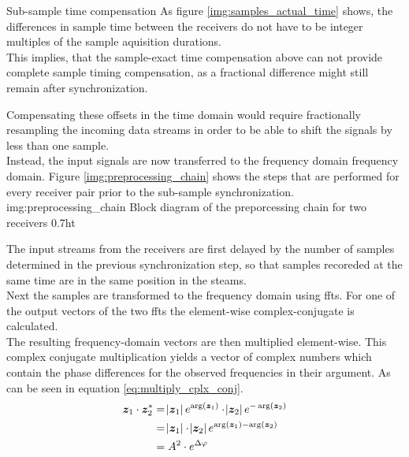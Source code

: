\begin{subchapter}{Sub-sample time compensation}
  As figure \ref{img:samples_actual_time} shows, the
  differences in sample time between the receivers do not
  have to be integer multiples of the sample aquisition durations. \\

  This implies, that the sample-exact time compensation above
  can not provide complete sample timing compensation, as
  a fractional difference might still remain after synchronization.

  Compensating these offsets in the time domain would
  require fractionally resampling the incoming data streams
  in order to be able to shift the signals by less than
  one sample. \\

  Instead, the input signals are now transferred to the frequency domain
  frequency domain. Figure \ref{img:preprocessing_chain}
  shows the steps that are performed for every receiver pair prior to
  the sub-sample synchronization. \\

               {img:preprocessing_chain}
               {Block diagram of the preporcessing chain for two receivers}
               {0.7}{ht}

  The input streams from the receivers are first delayed
  by the number of samples determined in the previous
  synchronization step, so that samples recoreded at the
  same time are in the same position in the steams. \\

  Next the samples are transformed to the frequency domain
  using \glspl{fft}.
  For one of the output vectors of the two \glspl{fft} the
  element-wise complex-conjugate is calculated. \\

  The resulting frequency-domain vectors are then
  multiplied element-wise. This complex conjugate multiplication
  yields a vector of complex numbers which contain the
  phase differences for the observed frequencies in
  their argument. As can be seen in equation
  \ref{eq:multiply_cplx_conj}. \\

  \begin{equation}
    \label{eq:multiply_cplx_conj}
    \begin{split}
      \bm{z}_\text{1} \cdot \bm{z}_\text{2}^{\ast}
      & = \abs{\bm{z}_\text{1}} e^{\arg(\bm{z}_\text{1})}
        \cdot
        \abs{\bm{z}_\text{2}} e^{-\arg(\bm{z}_\text{2})} \\
      & = \abs{\bm{z}_\text{1}} \cdot \abs{\bm{z}_\text{2}}
        e^{\arg(\bm{z}_\text{1}) - \arg(\bm{z}_\text{2})} \\
      & = A^{2} \cdot e^{\Delta \varphi}
    \end{split}
  \end{equation}


\end{subchapter}
